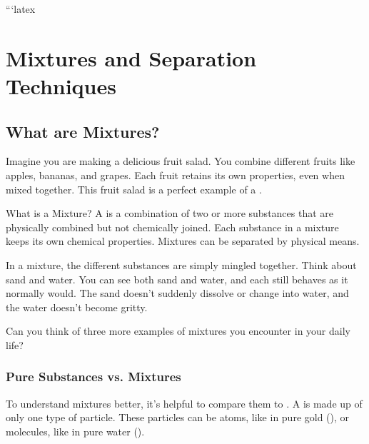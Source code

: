 ```latex
\chapter{Mixtures and Separation Techniques}


\section{What are Mixtures?}

Imagine you are making a delicious fruit salad. You combine different fruits like apples, bananas, and grapes. Each fruit retains its own properties, even when mixed together.  This fruit salad is a perfect example of a .

\begin{keyconcept}{What is a Mixture?}
A  is a combination of two or more substances that are physically combined but not chemically joined. Each substance in a mixture keeps its own chemical properties. Mixtures can be separated by physical means.
\end{keyconcept}

In a mixture, the different substances are simply mingled together.  Think about sand and water. You can see both sand and water, and each still behaves as it normally would.  The sand doesn't suddenly dissolve or change into water, and the water doesn't become gritty.


\begin{stopandthink}
Can you think of three more examples of mixtures you encounter in your daily life?
\end{stopandthink}

\subsection{Pure Substances vs. Mixtures}

To understand mixtures better, it's helpful to compare them to . A  is made up of only one type of particle.  These particles can be atoms, like in pure gold (), or molecules, like in pure water ().


